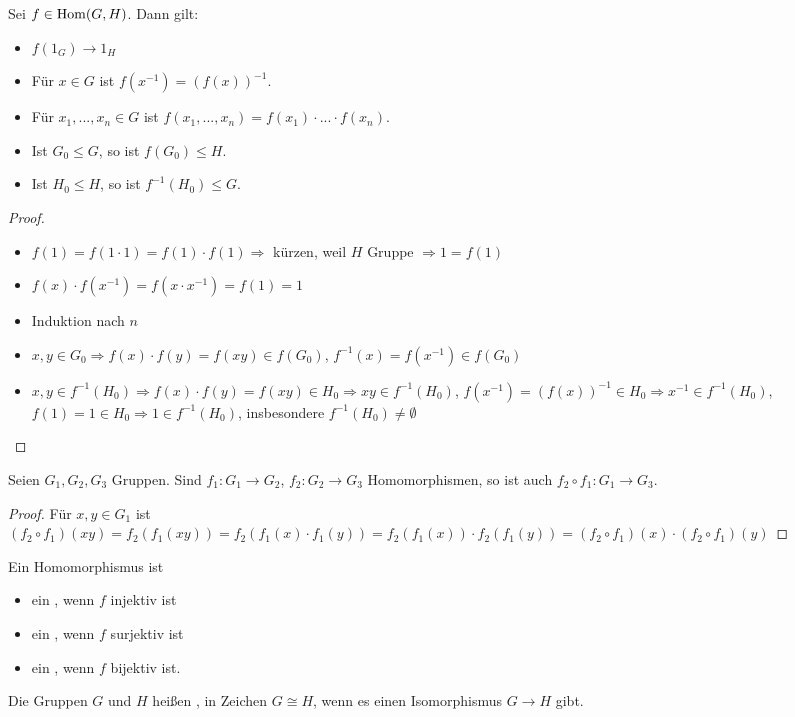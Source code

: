 \begin{proposition}
	Sei $f\in \operatorname{Hom}(G,H)$. Dann gilt: 
	\begin{itemize}
		\item $f(1_G)\to 1_H$
		\item Für $x\in G$ ist $f(x^{-1})=(f(x))^{-1}$.
		\item Für $x_1,...,x_n\in G$ ist $f(x_1,...,x_n)=f(x_1)\cdot ... \cdot f(x_n)$.
		\item Ist $G_0\le G$, so ist $f(G_0)\le H$.
		\item Ist $H_0\le H$, so ist $f^{-1}(H_0)\le G$.
	\end{itemize}
\end{proposition}
\begin{proof}
	\begin{itemize}
		\item $f(1)=f(1\cdot 1)=f(1)\cdot f(1) \Rightarrow$ kürzen, weil $H$ Gruppe $\Rightarrow 1=f(1)$
		\item $f(x)\cdot f(x^{-1})=f(x\cdot x^{-1})=f(1)=1$
		\item Induktion nach $n$
		\item $x,y\in G_0\Rightarrow f(x)\cdot f(y)=f(xy)\in f(G_0)$, $f^{-1}(x)=f(x^{-1})\in f(G_0)$
		\item $x,y\in f^{-1}(H_0)\Rightarrow f(x)\cdot f(y)=f(xy)\in H_0\Rightarrow xy\in f^{-1}(H_0)$, $f(x^{-1})=(f(x))
		^{-1}\in H_0\Rightarrow x^{-1}\in f^{-1}(H_0)$, $f(1)=1\in H_0\Rightarrow 1\in f^{-1}(H_0)$, insbesondere 
		$f^{-1}(H_0)\neq \emptyset$
	\end{itemize}
\end{proof}

\begin{proposition}
	Seien $G_1,G_2,G_3$ Gruppen. Sind $f_1:G_1\to G_2$, $f_2:G_2\to G_3$ Homomorphismen, so ist auch 
	$f_2\circ f_1:G_1\to G_3$.
\end{proposition}
\begin{proof}
	Für $x,y\in G_1$ ist $(f_2\circ f_1)(xy)=f_2(f_1(xy))=f_2(f_1(x)\cdot f_1(y))=f_2(f_1(x))\cdot f_2(f_1(y))=(f_2
	\circ f_1)(x)\cdot (f_2\circ f_1)(y)$
\end{proof}

\begin{definition}
	Ein Homomorphismus ist
	\begin{itemize}
		\item ein , wenn $f$ injektiv ist
		\item ein , wenn $f$ surjektiv ist
		\item ein , wenn $f$ bijektiv ist.
	\end{itemize}
	Die Gruppen $G$ und $H$ heißen , in Zeichen $G\cong H$, wenn 
	es einen Isomorphismus $G\to H$ gibt.
\end{definition}

